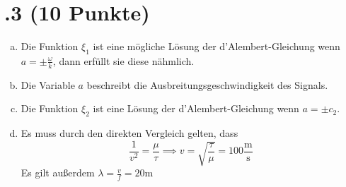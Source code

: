 \section*{\nr.3 \titthree (10 Punkte)}
\begin{enumerate}[(a)]
\item Die Funktion $\xi_1$ ist eine mögliche Lösung der d'Alembert-Gleichung wenn $a=\pm \frac{\omega}{k}$, dann erfüllt sie diese nähmlich.
\item Die Variable $a$ beschreibt die Ausbreitungsgeschwindigkeit des Signals.
\item Die Funktion $\xi_2$ ist eine Lösung der d'Alembert-Gleichung wenn $a=\pm c_2$.
\item Es muss durch den direkten Vergleich gelten, dass
\begin{equation}
  \frac{1}{v^2}=\frac{\mu}{\tau}\implies v=\sqrt{\frac{\tau}{\mu}}=100 \frac{\mathrm{m}}{\mathrm{s}}
\end{equation}
Es gilt außerdem $\lambda=\frac{v}{f}=20\mathrm{m}$
\end{enumerate}